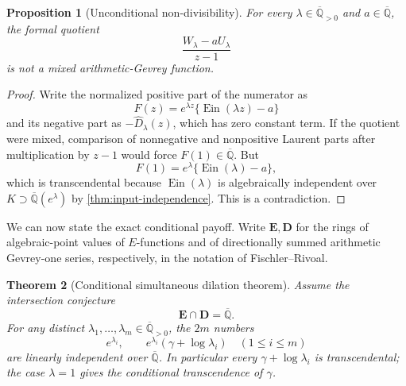\documentclass[11pt]{article}
\newtheorem{theorem}{Theorem}[section]
\newtheorem{proposition}[theorem]{Proposition}
\theoremstyle{definition}
\theoremstyle{remark}
\newcommand{\Qbar}{\overline{\mathbb Q}}
\newcommand{\Ein}{\operatorname{Ein}}
\begin{document}
\begin{proposition}[Unconditional non-divisibility]
\label{prop:mixed-nondivisibility}
For every \(\lambda\in\Qbar_{>0}\) and \(a\in\Qbar\), the formal quotient
\begin{equation}\label{eq:mixed-quotient}
 \frac{W_\lambda-aU_\lambda}{z-1}
\end{equation}
is not a mixed arithmetic-Gevrey function.
\end{proposition}

\begin{proof}
Write the normalized positive part of the numerator as
\[
 F(z)=e^{\lambda z}\{\Ein(\lambda z)-a\}
\]
and its negative part as \(-\widehat D_\lambda(z)\), which has zero constant
term.  If the quotient were mixed, comparison of nonnegative and
nonpositive Laurent parts after multiplication by \(z-1\) would force
\(F(1)\in\Qbar\).  But
\[
 F(1)=e^\lambda\{\Ein(\lambda)-a\},
\]
which is transcendental because \(\Ein(\lambda)\) is algebraically
independent over \(K\supset\Qbar(e^\lambda)\) by
\cref{thm:input-independence}.  This is a contradiction.
\end{proof}

We can now state the exact conditional payoff.  Write
\(\mathbf E,\mathbf D\) for the rings of algebraic-point values of
\(E\)-functions and of directionally summed arithmetic Gevrey-one series,
respectively, in the notation of Fischler--Rivoal.

\begin{theorem}[Conditional simultaneous dilation theorem]
\label{thm:conditional-mixed-dilations}
Assume the intersection conjecture
\begin{equation}\label{eq:ED-intersection}
 \mathbf E\cap\mathbf D=\Qbar.
\end{equation}
For any distinct
\(\lambda_1,\ldots,\lambda_m\in\Qbar_{>0}\), the \(2m\) numbers
\begin{equation}\label{eq:mixed-dilation-values}
 \boxed{\displaystyle
 e^{\lambda_i},\qquad
 e^{\lambda_i}(\gamma+\log\lambda_i)
 \quad(1\le i\le m)}
\end{equation}
are linearly independent over \(\Qbar\).  In particular every
\(\gamma+\log\lambda_i\) is transcendental; the case \(\lambda=1\) gives
the conditional transcendence of \(\gamma\).
\end{theorem}
\end{document}
